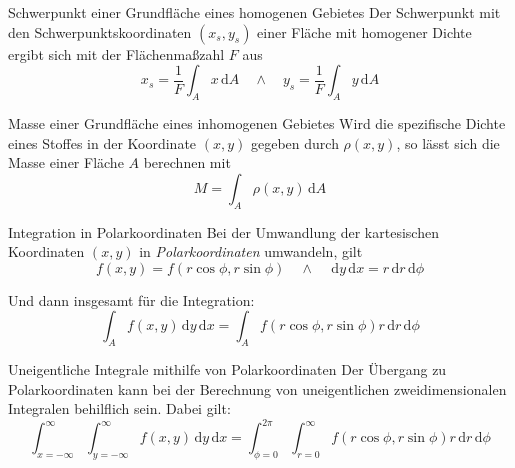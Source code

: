 \documentclass[german]{../spicker}
\renewcommand{\d}{\,\mathrm{d}}
\begin{document}
\begin{algo}{Schwerpunkt einer Grundfläche eines homogenen Gebietes}
    Der Schwerpunkt mit den Schwerpunktskoordinaten $(x_s, y_s)$ einer Fläche mit homogener Dichte ergibt sich mit der Flächenmaßzahl $F$ aus
    $$
        x_s = \frac{1}{F}\int_A x \d A \quad \land \quad y_s = \frac{1}{F}\int_A y \d A
    $$
\end{algo}

\begin{algo}{Masse einer Grundfläche eines inhomogenen Gebietes}
    Wird die spezifische Dichte eines Stoffes in der Koordinate $(x, y)$ gegeben durch $\rho(x, y)$, so lässt sich die Masse einer Fläche $A$ berechnen mit
    $$
        M = \int_A  \rho(x, y) \d A
    $$
\end{algo}

\begin{algo}{Integration in Polarkoordinaten}
    Bei der Umwandlung der kartesischen Koordinaten $(x, y)$ in \emph{Polarkoordinaten} umwandeln, gilt
    $$
        f(x, y) = f(r\cos\phi, r\sin\phi)\quad \land \quad \d y \d x = r \d r \d \phi
    $$

    Und dann insgesamt für die Integration:
    $$
        \int_A f(x, y) \d y \d x = \int_A f(r \cos\phi, r\sin\phi)r\d r\d\phi
    $$
\end{algo}

\begin{algo}{Uneigentliche Integrale mithilfe von Polarkoordinaten}
    Der Übergang zu Polarkoordinaten kann bei der Berechnung von uneigentlichen zweidimensionalen Integralen behilflich sein.
    Dabei gilt:
    $$
        \int_{x=-\infty}^\infty\int_{y=-\infty}^\infty f(x, y) \d y \d x = \int_{\phi = 0}^{2\pi} \int_{r = 0}^\infty f(r\cos\phi, r\sin\phi)r\d r\d\phi
    $$
\end{algo}
\end{document}
